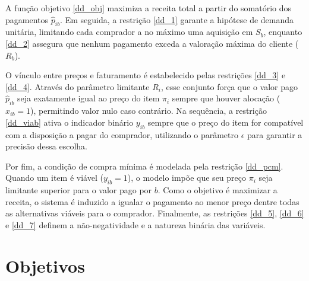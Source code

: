 \documentclass[11pt]{article}
\begin{document}
A função objetivo \eqref{dd_obj} maximiza a receita total a partir do somatório dos pagamentos $\hat{p}_{ib}$. Em seguida, a restrição \eqref{dd_1} garante a hipótese de demanda unitária, limitando cada comprador a no máximo uma aquisição em $S_b$, enquanto \eqref{dd_2} assegura que nenhum pagamento exceda a valoração máxima do cliente ($R_b$).

O vínculo entre preços e faturamento é estabelecido pelas restrições \eqref{dd_3} e \eqref{dd_4}. Através do parâmetro limitante $R_i$, esse conjunto força que o valor pago $\hat{p}_{ib}$ seja exatamente igual ao preço do item $\pi_i$ sempre que houver alocação ($x_{ib} = 1$), permitindo valor nulo caso contrário. Na sequência, a restrição \eqref{dd_viab} ativa o indicador binário $y_{ib}$ sempre que o preço do item for compatível com a disposição a pagar do comprador, utilizando o parâmetro $\epsilon$ para garantir a precisão dessa escolha.

Por fim, a condição de compra mínima é modelada pela restrição \eqref{dd_pcm}. Quando um item é viável ($y_{ib} = 1$), o modelo impõe que seu preço $\pi_i$ seja limitante superior para o valor pago por $b$. Como o objetivo é maximizar a receita, o sistema é induzido a igualar o pagamento ao menor preço dentre todas as alternativas viáveis para o comprador. Finalmente, as restrições \eqref{dd_5}, \eqref{dd_6} e \eqref{dd_7} definem a não-negatividade e a natureza binária das variáveis.













































 
\section{Objetivos}
\end{document}
